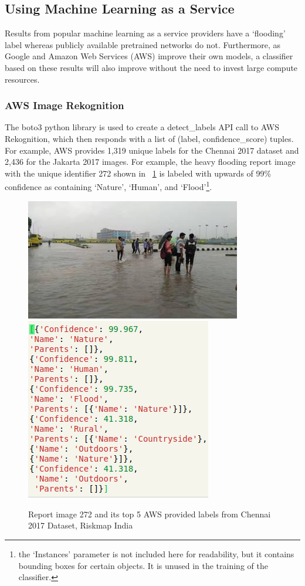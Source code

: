 \subsection{Using Machine Learning as a Service}
Results from popular machine learning as a service providers have a `flooding'
label whereas publicly available pretrained networks do not. Furthermore, as
Google and Amazon Web Services (AWS) improve their own models, a classifier
based on these results will also improve without the need to invest large
compute resources.

\subsubsection{AWS Image Rekognition}\label{chap4:aws}
The boto3 python library is used to create a detect\_labels API call 
to AWS Rekognition, which then responds with a list of (label,
confidence\_score) tuples. For example, AWS provides 1,319 unique labels for the
Chennai 2017 dataset and 2,436 for the Jakarta 2017 images. For example, the
heavy flooding report image with the unique identifier 272 shown in
\figureautorefname{}~\ref{fig:aws_272} is labeled with upwards of 99\% confidence as containing `Nature', `Human', and `Flood'\footnote{the `Instances' parameter is
not included here for readability, but it contains bounding boxes for certain
objects. It is unused in the training of the classifier.}.
\begin{figure}[ht]
    \centering
    \captionsetup{justification=centering}
    \includegraphics[scale=0.6]{images/ch/272.jpeg}
    \includegraphics[scale=0.6]{images/ch/aws_272.png}
    \caption{Report image 272 and its top 5 AWS provided labels from Chennai
    2017 Dataset, Riskmap India}\label{fig:aws_272}
\end{figure}

